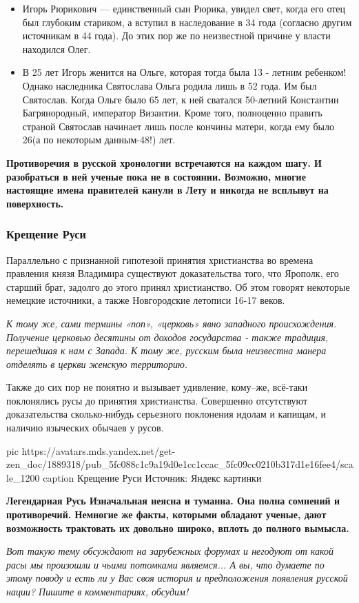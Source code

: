 \begin{itemize}
\item Игорь Рюрикович — единственный сын Рюрика, увидел свет, когда его отец
				был глубоким стариком, а вступил в наследование в 34 года (согласно
								другим источникам в 44 года). До этих пор же по неизвестной
								причине у власти находился Олег.

\item В 25 лет Игорь женится на Ольге, которая тогда была 13 - летним ребенком!
				Однако наследника Святослава Ольга родила лишь в 52 года. Им был
				Святослав. Когда Ольге было 65 лет, к ней сватался 50-летний Константин
				Багрянородный, император Византии. Кроме того, полноценно править
				страной Святослав начинает лишь после кончины матери, когда ему было
				26(а по некоторым данным-48!) лет.
\end{itemize}

\textbf{Противоречия в русской хронологии встречаются на каждом шагу. И разобраться в
ней ученые пока не в состоянии. Возможно, многие настоящие имена правителей
канули в Лету и никогда не всплывут на поверхность.}

\subsubsection{Крещение Руси}

Параллельно с признанной гипотезой принятия христианства во времена правления
князя Владимира существуют доказательства того, что Ярополк, его старший брат,
задолго до этого принял христианство. Об этом говорят некоторые немецкие
источники, а также Новгородские летописи 16-17 веков.

{\color{orange}\em
К тому же, сами термины «поп», «церковь» явно западного происхождения.
Получение церковью десятины от доходов государства - также традиция, перешедшая
к нам с Запада. К тому же, русским была неизвестна манера отделять в церкви
женскую территорию.
}

Также до сих пор не понятно и вызывает удивление, кому–же, всё-таки поклонялись
русы до принятия христианства. Совершенно отсутствуют доказательства
сколько-нибудь серьезного поклонения идолам и капищам, и наличию языческих
обычаев у русов.

\ifcmt
pic https://avatars.mds.yandex.net/get-zen_doc/1889318/pub_5fc088c1c9a19d0e1cc1ccac_5fc09cc0210b317d1e16fee4/scale_1200
caption Крещение Руси Источник: Яндекс картинки
\fi

\textbf{Легендарная Русь Изначальная неясна и туманна. Она полна сомнений и
противоречий. Немногие же факты, которыми обладают ученые, дают возможность
трактовать их довольно широко, вплоть до полного вымысла.}

\begin{leftbar}
	\em
Вот такую тему обсуждают на зарубежных форумах и негодуют от какой расы мы
произошли и чьими потомками являемся... А вы, что думаете по этому
поводу и есть ли у Вас своя история и предположения появления русской
нации? Пишите в комментариях, обсудим!
\end{leftbar}

